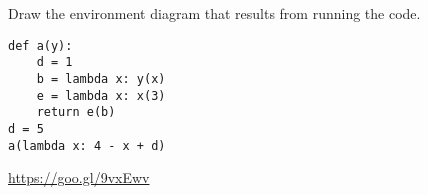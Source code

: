 \begin{blocksection}
\question Draw the environment diagram that results from running the code.

\begin{lstlisting}
def a(y):
    d = 1
    b = lambda x: y(x)
    e = lambda x: x(3)
    return e(b)
d = 5
a(lambda x: 4 - x + d)
\end{lstlisting}

\begin{solution}[2in]
\url{https://goo.gl/9vxEwv}
\end{solution}
\end{blocksection}
